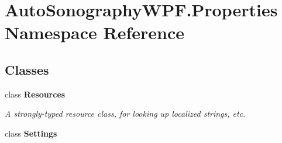 \hypertarget{namespace_auto_sonography_w_p_f_1_1_properties}{}\section{Auto\+Sonography\+W\+P\+F.\+Properties Namespace Reference}
\label{namespace_auto_sonography_w_p_f_1_1_properties}
\subsection*{Classes}
\begin{DoxyCompactItemize}
\item 
class {\bfseries Resources}
\begin{DoxyCompactList}\small\item\em A strongly-\/typed resource class, for looking up localized strings, etc. \end{DoxyCompactList}\item 
class {\bfseries Settings}
\end{DoxyCompactItemize}
